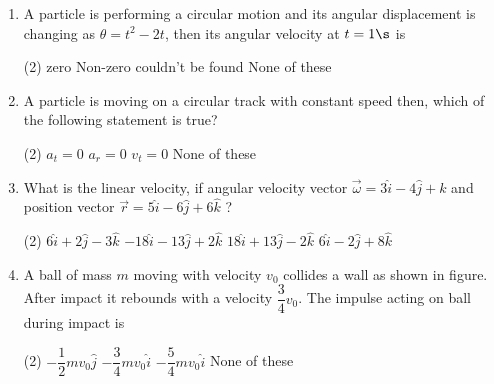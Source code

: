 \documentclass{article}
\newcommand{\ans}{\textcolor{red!95}{\textit{\quad}}}
\begin{document}
\begin{enumerate}
\item A particle is performing a circular motion and its angular displacement is changing as $\theta=t^2-2t$, then its angular velocity at $t=1\s$ is
\begin{tasks}(2)
	\task zero\ans
	\task Non-zero
	\task couldn't be found
	\task None of these
\end{tasks} 

\item A particle is moving on a circular track with constant speed then, which of the following statement is true?
\begin{tasks}(2)
	\task $a_t = 0$\ans
	\task $a_r = 0$
	\task $v_t = 0$
	\task None of these
\end{tasks}

\item What is the linear velocity, if angular velocity vector $\vec{\omega}=3\hat{i}-4\hat{j}+k$ and position vector $\vec{r}=5\hat{i} -6\hat{j} +6\hat{k}$ ?
\begin{tasks}(2)
	\task $6\hat{i} + 2\hat{j} -3\hat{k}$
	\task $-18\hat{i}-13\hat{j}+2\hat{k}$\ans
	\task $18\hat{i}+13\hat{j}-2\hat{k}$
	\task $6\hat{i}-2\hat{j}+8\hat{k}$
\end{tasks}

\item A ball of mass $m$ moving with velocity $v_0$ collides a wall as shown in figure. After impact it rebounds with a velocity $\dfrac{3}{4}v_0$. The impulse acting on ball during impact is
\begin{center}
\end{center}
\begin{tasks}(2)
	\task $-\dfrac{1}{2}mv_0\hat{j}$
	\task $-\dfrac{3}{4}mv_0\hat{i}$
	\task $-\dfrac{5}{4}mv_0\hat{i}$\ans
	\task None of these
\end{tasks}



\begin{center}
\end{center}

            
	
\end{enumerate}
\end{document}

